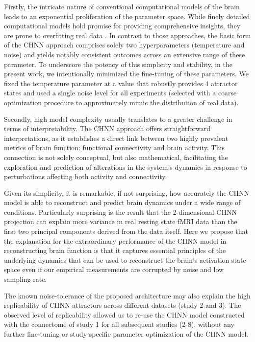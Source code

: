 \documentclass{article}
\begin{document}
Firstly, the intricate nature of conventional computational models of the brain leads to an exponential proliferation of the parameter space.
While finely detailed computational models hold promise for providing comprehensive insights, they are prone to overfitting real data \citep{breakspear2017dynamic}.
In contrast to those approaches, the basic form of the CHNN approach comprises solely two hyperparameters (temperature and noise) and yields notably consistent outcomes across an extensive range of these parameter. To underscore the potency of this simplicity and stability, in the present work, we intentionally minimized the fine-tuning of these parameters. We fixed the temperature parameter at a value that robustly provides 4 attractor
states and used a single noise level for all experiments (selected with a coarse optimization procedure to approximately
mimic the distribution of real data).

Secondly, high model complexity usually translates to a greater challenge in terms of interpretability.
The CHNN approach offers straightforward interpretations, as it establishes a
direct link between two highly prevalent metrics of brain function: functional connectivity and brain activity.
This connection is not solely conceptual, but also mathematical, facilitating the exploration and prediction of alterations in the system's dynamics in response to perturbations affecting both activity and connectivity.

Given its simplicity, it is remarkable, if not surprising, how accurately the CHNN model is able to
reconstruct and predict brain dynamics under a wide range of conditions. Particularly surprising is the result
that the 2-dimensional CHNN projection can explain more variance in real resting state fMRI data than the first two principal components derived from the data itself.
Here we propose that the explanation for the extraordinary performance of the CHNN model in reconstructing brain function is that it captures essential principles of the underlying dynamics that can be used to reconstruct the brain's activation state-space even if our empirical measurements are corrupted by noise and low sampling rate.

The known noise-tolerance of the proposed architecture may also explain the high replicability of CHNN attractors across different
datasets (study 2 and 3). The observed level of replicability allowed us to re-use the CHNN model constructed with the
connectome of study 1 for all subsequent studies (2-8), without any further fine-tuning or study-specific parameter
optimization of the CHNN model.
\end{document}
